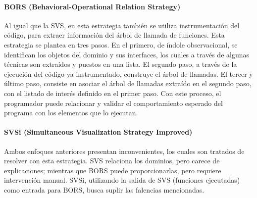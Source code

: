 \paragraph{BORS (Behavioral-Operational Relation Strategy)}
Al igual que la SVS, en esta estrategia también se utiliza instrumentación del código,
para extraer información del árbol de llamada de funciones.
Esta estrategia se plantea en tres pasos.
En el primero, de índole observacional, se identifican los objetos del dominio y sus interfaces,
los cuales a través de algunas técnicas son extraídos y puestos en una lista.
El segundo paso, a través de la ejecución del código ya instrumentado, construye el árbol de
llamadas.
El tercer y último paso, consiste en asociar el árbol de llamadas extraído en el segundo paso,
con el listado de interés definido en el primer paso.
Con este proceso, el programador puede relacionar y validar el comportamiento esperado del programa
con los elementos que lo ejecutan\cite{FonsecaCruzHenriquesPereira08}.

\paragraph{SVSi (Simultaneous Visualization Strategy Improved)}
Ambos enfoques anteriores presentan inconvenientes, los cuales son tratados de resolver
con esta estrategia.
SVS relaciona los dominios, pero carece de explicaciones; mientras que BORS puede proporcionarlas,
pero requiere intervención manual.
SVSi, utilizando la salida de SVS (funciones ejecutadas) como entrada para BORS, busca
suplir las falencias mencionadas.
